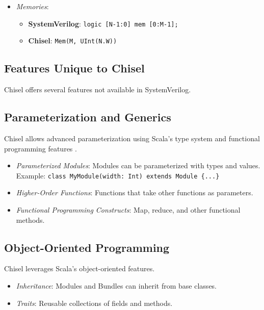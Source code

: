 \begin{itemize}
    \item \textit{Memories}:
        \begin{itemize}
            \item \textbf{SystemVerilog}: \texttt{logic [N-1:0] mem [0:M-1];}
            \item \textbf{Chisel}: \texttt{Mem(M, UInt(N.W))}
        \end{itemize}
\end{itemize}

\subsection{Features Unique to Chisel}

Chisel offers several features not available in SystemVerilog.

\subsection{Parameterization and Generics}

Chisel allows advanced parameterization using Scala's type system and functional programming features \cite{chisel-doc}.

\begin{itemize}
    \item \textit{Parameterized Modules}: Modules can be parameterized with types and values.
        \newline Example: \texttt{class MyModule(width: Int) extends Module \{...\}}
    \item \textit{Higher-Order Functions}: Functions that take other functions as parameters.
    \item \textit{Functional Programming Constructs}: Map, reduce, and other functional methods.
\end{itemize}

\subsection{Object-Oriented Programming}

Chisel leverages Scala's object-oriented features.

\begin{itemize}
    \item \textit{Inheritance}: Modules and Bundles can inherit from base classes.
    \item \textit{Traits}: Reusable collections of fields and methods.
\end{itemize}

